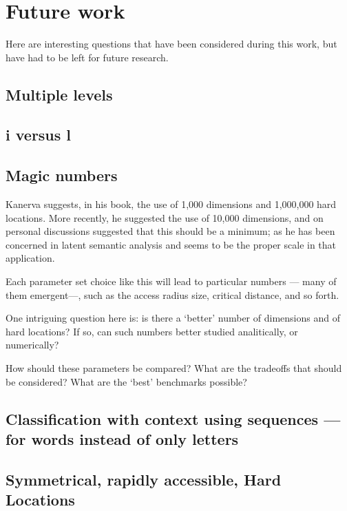 \section{Future work}

Here are interesting questions that have been considered during this work, but have had to be left for future research.

\subsection{Multiple levels}


\subsection{i versus l}


\subsection{Magic numbers}

Kanerva suggests, in his book, the use of 1,000 dimensions and 1,000,000 hard locations.  More recently, he suggested the use of 10,000 dimensions, and on personal discussions suggested that this should be a minimum; as he has been concerned in latent semantic analysis and seems to be the proper scale in that application.

Each parameter set choice like this will lead to particular numbers --- many of them emergent---, such as the access radius size, critical distance, and so forth.

One intriguing question here is:  is there a `better' number of dimensions and of hard locations?  If so, can such numbers better studied analitically, or numerically?

How should these parameters be compared?  What are the tradeoffs that should be considered?  What are the `best' benchmarks possible?

\subsection{Classification with context using sequences --- for words instead of only letters}










\subsection{Symmetrical, rapidly accessible, Hard Locations}

